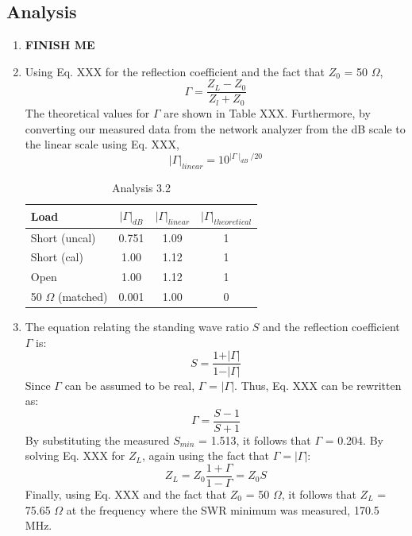 \documentclass{article}
\begin{document}
\subsection{Analysis}
\begin{enumerate}
	\item \textbf{FINISH ME}
	
	\item Using Eq. XXX for the reflection coefficient and the fact that $Z_0$ = 50 $\Omega$,
	\begin{equation}
		\Gamma = \frac{Z_L-Z_0}{Z_l+Z_0}
	\end{equation}
	The theoretical values for $\Gamma$ are shown in Table XXX. Furthermore, by converting our measured data from the network analyzer from the dB scale to the linear scale using Eq. XXX,
	\begin{equation}
		\vert\Gamma\vert_{linear} = 10^{\mid\Gamma\mid_{dB}/20}
	\end{equation}
	
	\begin{table}[H]
	\centering
		\begin{tabular}{|l|c|c|c|}
		\hline
		\textbf{Load}     & $\vert\Gamma\vert_{dB}$ & $\vert\Gamma\vert_{linear}$ & $\vert\Gamma\vert_{theoretical}$ \\ \hline
		Short (uncal)     & 0.751 	  & 1.09      &    1      \\ \hline
		Short (cal)       & 1.00      & 1.12      &    1      \\ \hline
		Open              & 1.00  	  & 1.12      &    1      \\ \hline
		50 $\Omega$ (matched) & 0.001 & 1.00  	  &    0      \\ \hline
		\end{tabular}
		\caption{Analysis 3.2}
		\label{}
	\end{table}	

	\item The equation relating the standing wave ratio $S$ and the reflection coefficient $\Gamma$ is:
	\begin{equation} 
		S = \frac{1 + \vert\Gamma\vert}{1 - \vert\Gamma\vert}
	\end{equation}
	Since $\Gamma$ can be assumed to be real, $\Gamma$ = $\vert\Gamma\vert$. Thus, Eq. XXX can be rewritten as:
	\begin{equation}
		\Gamma = \frac{S - 1}{S + 1}
	\end{equation}
	By substituting the measured $S_{min}$ = 1.513, it follows that $\Gamma$ = 0.204. By solving Eq. XXX for $Z_L$, again using the fact that $\Gamma = \vert\Gamma\vert$:
	\begin{equation}
		Z_L = Z_0\frac{1 + \Gamma}{1 - \Gamma} = Z_0 S
	\end{equation}	 
	Finally, using Eq. XXX and the fact that $Z_0$ = 50 $\Omega$, it follows that $Z_L$ = 75.65 $\Omega$ at the frequency where the SWR minimum was measured, 170.5 MHz.
\end{enumerate}
\end{document}
